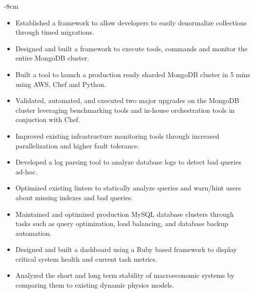 \documentclass[10pt,a4paper,academicons]{altacv}
\begin{document}

\begin{adjustwidth}{}{-8cm}
\makecvheader
\end{adjustwidth}


\begin{itemize}
\item Established a framework to allow developers to easily denormalize collections through timed migrations.
\item Designed and built a framework to execute tools, commands and monitor the entire MongoDB cluster.
\item Built a tool to launch a production ready sharded MongoDB cluster in 5 mins using AWS, Chef and Python.
\item Validated, automated, and executed two major upgrades on the MongoDB cluster leveraging benchmarking tools and in-house orchestration tools in conjuction with Chef.
\item Improved existing infrastructure monitoring tools through increased parallelization and higher fault tolerance.
\item Developed a log parsing tool to analyze database logs to detect bad queries ad-hoc.
\item Optimized existing linters to statically analyze queries and warn/hint users about missing indexes and bad queries. 
\end{itemize}

\divider

\begin{itemize}
\item Maintained and optimized production MySQL database clusters through tasks such as query optimization, load balancing, and database backup automation.
\item Designed and built a dashboard using a Ruby based framework to display critical system health and current task metrics.
\end{itemize}

\divider

\begin{itemize}
\item Analyzed the short and long term stability of macroeconomic systems by
    comparing them to existing dynamic physics models.
\end{itemize}
\end{document}
